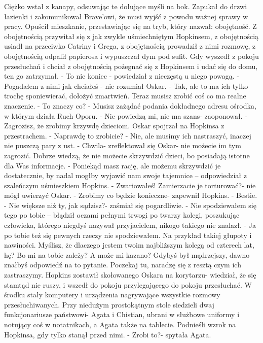 \documentclass[12pt,a4paper]{book}
\begin{document}
Ciężko wstał z kanapy, odsuwając te dołujące myśli na bok. Zapukał do drzwi łazienki i zakomunikował Brave’owi, że musi wyjść z powodu ważnej sprawy w pracy. Opuścił mieszkanie, przestawiając się na tryb, który nazwał: obojętność. Z obojętnością przywitał się z jak zwykle uśmiechniętym Hopkinsem, z obojętnością usiadł na przeciwko Catriny i Grega, z obojętnością prowadził z nimi rozmowę, z obojętnością odpalił papierosa i wypuszczał dym pod sufit. Gdy wyszedł z pokoju przesłuchań i chciał z obojętnością pożegnać się z Hopkinsem i udać się do domu, ten go zatrzymał.
- To nie koniec - powiedział z nieczęstą u niego powagą. 
- Pogadałem z nimi jak chciałeś - nie rozumiał Oskar.
- Tak, ale to ma ich tylko trochę sponiewierać, dołożyć zmartwień. Teraz musisz zrobić coś co ma realne znaczenie.
- To znaczy co?
- Musisz zażądać podania dokładnego adresu ośrodka, w którym działa Ruch Oporu.
- Nie powiedzą mi, nie ma szans- zaoponował.
- Zagrozisz, że zrobimy krzywdę dzieciom. 
Oskar spojrzał na Hopkinsa z przestrachem.
- Naprawdę to zrobicie?
- Nie, ale musimy ich nastraszyć, inaczej nie puszczą pary z ust. 
- Chwila- zreflektował się Oskar- nie możecie im tym zagrozić. Dobrze wiedzą, że nie możecie skrzywdzić dzieci, bo posiadają istotne dla Was informacje. 
- Poniekąd masz rację, ale możemu skrzywdzić je dostatecznie, by nadal mogłby wyjawić nam swoje tajemnice – odpowiedział z szaleńczym uśmieszkiem Hopkins. 
- Zwariowałeś! Zamierzacie je torturować?- nie mógł uwierzyć Oskar.
- Zrobimy co będzie konieczne- zapewnił Hopkins.
- Bestie. 
- Nie większe niż ty, jak sądzisz?- zaśmiał się pogardliwie.
- Nie spodziewałem się tego po tobie – błądził oczami pełnymi trwogi po twarzy kolegi, poszukując człowieka, którego niegdyś nazywał przyjacielem, nikogo takiego nie znalazł. 
- Ja po tobie też się pewnych rzeczy nie spodziewałem. Na przykład takiej głupoty i nawiności. Myślisz, że dlaczego jestem twoim najbliższym kolegą od czterech lat, hę? Bo mi na tobie zależy? A może mi kazano? Gdybyś był mądrzejszy, dawno znałbyś odpowiedź na to pytanie. Poczekaj tu, naradzę się z resztą czym ich zastraszymy. 
Hopkins zostawił skołowanego Oskara na korytarzu- wiedział, że się stamtąd nie ruszy, i wszedł do pokoju przylegającego do pokoju przesłuchać. W środku stały komputery i urządzenia nagrywające wszystkie rozmowy przesłuchiwanych. Przy niedużym prostokątnym stole siedzieli dwaj funkcjonariusze państwowi- Agata i Chistian, ubrani w służbowe uniformy i notujący coś w notatnikach, a Agata także na tablecie. Podnieśli wzrok na Hopkinsa, gdy tylko stanął przed nimi.
- Zrobi to?- spytała Agata.
\end{document}
